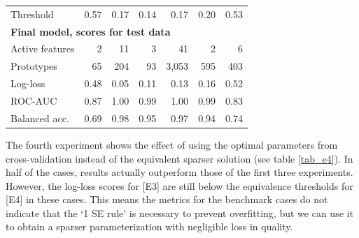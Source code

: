 \begin{table}
\begin{center}
\begin{tabular}{|lrrrrrr|}
Threshold&0.57&0.17&0.14&0.17&0.20&0.53\\
\multicolumn{7}{|l|}{\textbf{Final model, scores for test data}}\\
Active features&2&11&3&41&2&6\\
Prototypes&65&204&93&3,053&595&403\\
Log-loss&0.48&0.05&0.11&0.13&0.16&0.52\\
ROC-AUC&0.87&1.00&0.99&1.00&0.99&0.83\\
Balanced acc.&0.69&0.98&0.95&0.97&0.94&0.74\\
\hline
\end{tabular}
\end{center}
\end{table}
%
The fourth experiment shows the effect of using the optimal parameters from cross-validation instead of the equivalent sparser solution (see table \ref{tab_e4}).
In half of the cases, results actually outperform those of the first three experiments.
However, the log-loss scores for [E3] are still below the equivalence thresholds for [E4] in these cases.
This means the metrics for the benchmark cases do not indicate that the `1 SE rule' is necessary to prevent overfitting, but we can use it to obtain a sparser parameterization with negligible loss in quality.
%
\clearpage
%
